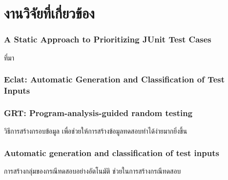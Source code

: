 \section{งานวิจัยที่เกี่ยวข้อง} 

\subsubsection{A Static Approach to Prioritizing JUnit Test Cases \cite{6363461}}
ที่มา

\subsubsection{Eclat: Automatic Generation and Classification of Test Inputs \cite{Heaton2000}}

\subsubsection{GRT: Program-analysis-guided random testing \cite{Ma2016}}
วิธีการสร้างกรอบข้อมูล เพื่อช่วยให้การสร้างข้อมูลทดสอบทำได้ง่ายมากยิ่งขึ้น

\subsubsection{Automatic generation and classification of test inputs \cite{Pacheco2005}}
การสร้างกลุ่มของกรณีทดสอบอย่างอัตโนมัติ ช่วยในการสร้างกรณีทดสอบ
